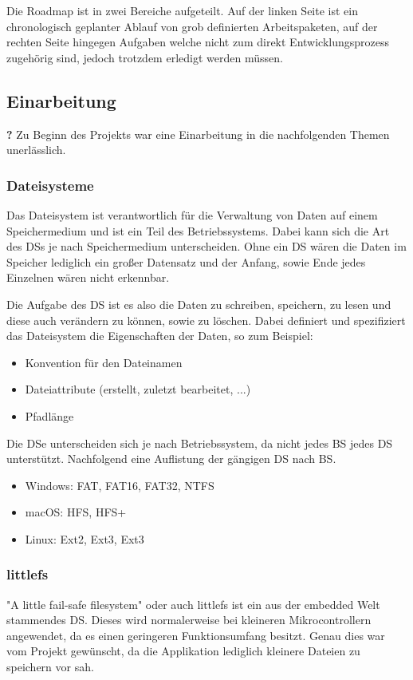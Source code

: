 Die Roadmap ist in zwei Bereiche aufgeteilt.
Auf der linken Seite ist ein chronologisch geplanter Ablauf von grob definierten Arbeitspaketen,
auf der rechten Seite hingegen Aufgaben welche nicht zum direkt Entwicklungsprozess zugehörig sind, jedoch trotzdem erledigt werden müssen.


\subsection{Einarbeitung}
\label{section:einarbeitung}
\textbf{?} Zu Beginn des Projekts war eine Einarbeitung in die nachfolgenden Themen unerlässlich.

\subsubsection{Dateisysteme}
Das Dateisystem ist verantwortlich für die Verwaltung von Daten auf einem Speichermedium und ist ein Teil des Betriebssystems.
Dabei kann sich die Art des \acl{DS}s je nach Speichermedium unterscheiden.
Ohne ein \acl{DS} wären die Daten im Speicher lediglich ein großer Datensatz und der Anfang, sowie Ende jedes Einzelnen wären nicht erkennbar.

Die Aufgabe des \acl{DS} ist es also die Daten zu schreiben, speichern, zu lesen und diese auch verändern zu können, sowie zu löschen.
Dabei definiert und spezifiziert das Dateisystem die Eigenschaften der Daten, so zum Beispiel:
\begin{itemize}
	\item Konvention für den Dateinamen
	\item Dateiattribute (erstellt, zuletzt bearbeitet, ...)
	\item Pfadlänge
\end{itemize}

Die \acl{DS}e unterscheiden sich  je nach Betriebssystem, da nicht jedes \acl{BS} jedes \acl{DS} unterstützt.
Nachfolgend eine Auflistung der gängigen \acl{DS} nach \acl{BS}.
\begin{itemize}
	\item Windows:	FAT, FAT16, FAT32, NTFS
	\item macOS:	HFS, HFS+
	\item Linux:	Ext2, Ext3, Ext3
\end{itemize}



\subsubsection{littlefs}
"A little fail-safe filesystem" oder auch littlefs ist ein aus der embedded Welt stammendes \acl{DS}.
Dieses wird normalerweise bei kleineren Mikrocontrollern angewendet, da es einen geringeren Funktionsumfang besitzt.
Genau dies war vom Projekt gewünscht, da die Applikation lediglich kleinere Dateien zu speichern vor sah.\\

